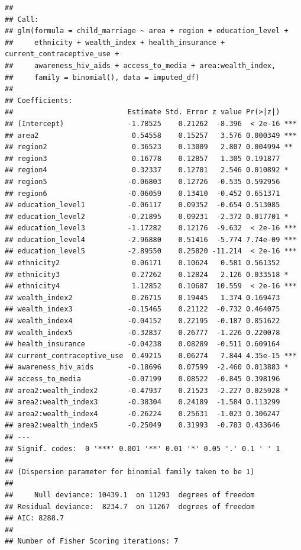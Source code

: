 \documentclass[
]{article}
\begin{document}
\begin{verbatim}
## 
## Call:
## glm(formula = child_marriage ~ area + region + education_level + 
##     ethnicity + wealth_index + health_insurance + current_contraceptive_use + 
##     awareness_hiv_aids + access_to_media + area:wealth_index, 
##     family = binomial(), data = imputed_df)
## 
## Coefficients:
##                           Estimate Std. Error z value Pr(>|z|)    
## (Intercept)               -1.78525    0.21262  -8.396  < 2e-16 ***
## area2                      0.54558    0.15257   3.576 0.000349 ***
## region2                    0.36523    0.13009   2.807 0.004994 ** 
## region3                    0.16778    0.12857   1.305 0.191877    
## region4                    0.32337    0.12701   2.546 0.010892 *  
## region5                   -0.06803    0.12726  -0.535 0.592956    
## region6                   -0.06059    0.13410  -0.452 0.651371    
## education_level1          -0.06117    0.09352  -0.654 0.513085    
## education_level2          -0.21895    0.09231  -2.372 0.017701 *  
## education_level3          -1.17282    0.12176  -9.632  < 2e-16 ***
## education_level4          -2.96880    0.51416  -5.774 7.74e-09 ***
## education_level5          -2.89550    0.25820 -11.214  < 2e-16 ***
## ethnicity2                 0.06171    0.10624   0.581 0.561352    
## ethnicity3                 0.27262    0.12824   2.126 0.033518 *  
## ethnicity4                 1.12852    0.10687  10.559  < 2e-16 ***
## wealth_index2              0.26715    0.19445   1.374 0.169473    
## wealth_index3             -0.15465    0.21122  -0.732 0.464075    
## wealth_index4             -0.04152    0.22195  -0.187 0.851622    
## wealth_index5             -0.32837    0.26777  -1.226 0.220078    
## health_insurance          -0.04238    0.08289  -0.511 0.609164    
## current_contraceptive_use  0.49215    0.06274   7.844 4.35e-15 ***
## awareness_hiv_aids        -0.18696    0.07599  -2.460 0.013883 *  
## access_to_media           -0.07199    0.08522  -0.845 0.398196    
## area2:wealth_index2       -0.47937    0.21523  -2.227 0.025928 *  
## area2:wealth_index3       -0.38304    0.24189  -1.584 0.113299    
## area2:wealth_index4       -0.26224    0.25631  -1.023 0.306247    
## area2:wealth_index5       -0.25049    0.31993  -0.783 0.433646    
## ---
## Signif. codes:  0 '***' 0.001 '**' 0.01 '*' 0.05 '.' 0.1 ' ' 1
## 
## (Dispersion parameter for binomial family taken to be 1)
## 
##     Null deviance: 10439.1  on 11293  degrees of freedom
## Residual deviance:  8234.7  on 11267  degrees of freedom
## AIC: 8288.7
## 
## Number of Fisher Scoring iterations: 7
\end{verbatim}
\end{document}
